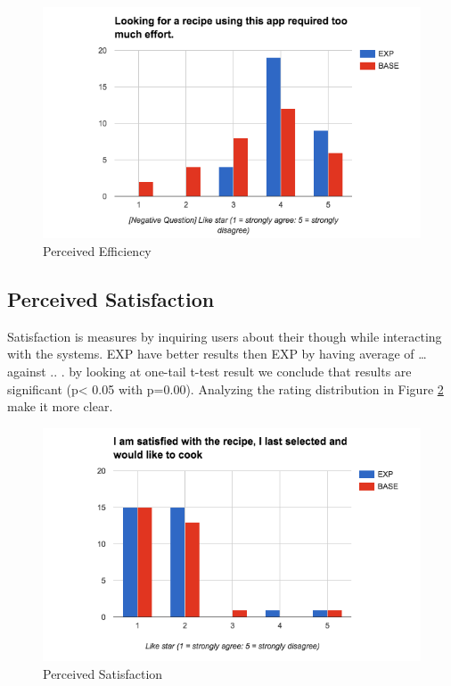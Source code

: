 \begin{figure}[h]
	\centering
	\includegraphics[width= 1\linewidth]{figures/ch5_stat_effiiciency}
	\caption{Perceived Efficiency}
	\label{fig:ch5_stat_effiiciency}
\end{figure}

\subsection{Perceived Satisfaction}

Satisfaction is measures by inquiring users about their though while interacting with the systems. EXP have better results then EXP by having average of … against .. . by looking at one-tail t-test result we conclude that results are significant (p< 0.05 with p=0.00). Analyzing the rating distribution in Figure \ref{fig:ch5_stat_satisfaction} make it more clear. 

\begin{figure}[h]
	\centering
	\includegraphics[width= 1\linewidth]{figures/ch5_stat_satisfaction}
	\caption{Perceived Satisfaction}
	\label{fig:ch5_stat_satisfaction}
\end{figure}

